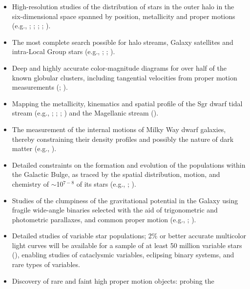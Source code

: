 \begin{itemize}
\item High-resolution studies of the distribution of stars in the outer halo
          in the six-dimensional space spanned by position, metallicity and proper
          motions (e.g., \cite{2006AJ....132.1768G}; \cite{2008ApJ...680..295B}; \cite{2008ApJ...673..864J};
          \cite{2008ApJ...684..287I}; \cite{2010ApJ...716....1B}).
\item The most complete search possible for halo streams, Galaxy satellites and intra-Local Group
          stars (e.g., \cite{2007ApJ...654..897B}; \cite{2009AJ....137..450W}; \cite{2014AJ....147...76B}).
\item Deep and highly accurate color-magnitude diagrams for over half of the known
          globular clusters, including tangential velocities from proper motion
          measurements (\cite{2008ApJS..179..326A}; \cite{2007AJ....134..195C}).
\item Mapping the metallicity, kinematics and spatial profile of the Sgr dwarf tidal
          stream (e.g., \cite{2001ApJ...547L.133I}; \cite{2003ApJ...599.1082M}; \cite{2005ApJ...619..807L}; \cite{2014MNRAS.437..116B})
          and the Magellanic stream (\cite{2004AJ....128.1606Z}).
\item The measurement of the internal motions of Milky Way dwarf
          galaxies, thereby constraining their density profiles and
	  possibly the nature of dark matter (e.g., \cite{2011ApJ...742...20W}).
\item Detailed constraints on the formation and evolution of the populations within the Galactic Bulge, as traced by the spatial
          distribution, motion, and chemistry of $\sim$10$^{7-8}$ of its stars (e.g., \cite{2011A&A...534A..80H}; \cite{2014ApJ...787L..19N}).
\item Studies of the clumpiness of the gravitational potential in the Galaxy using
          fragile wide-angle binaries selected with the aid of trigonometric and
          photometric parallaxes, and common proper motion (e.g., \cite{2004ApJ...601..311Y}; \cite{2010A&A...509A..46L}).
\item Detailed studies of variable star populations; 2\% or better accurate
          multicolor light curves will be available for a sample of at least 50
          million variable stars (\cite{2007AJ....134.2236S}), enabling studies of
          cataclysmic variables, eclipsing binary systems, and rare types of variables.
\item Discovery of rare and faint high proper motion objects: probing the

\end{itemize}
